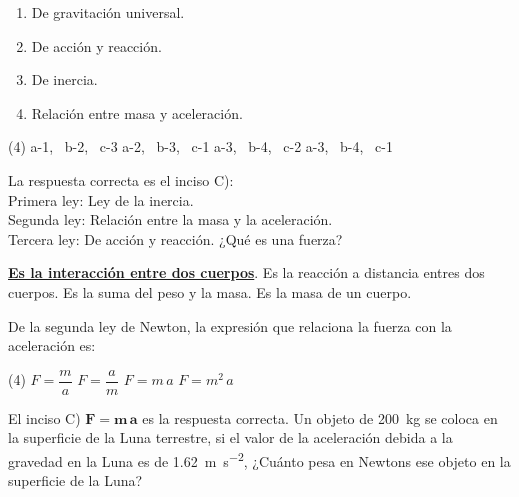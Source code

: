 \documentclass[12pt, letter]{exam}
\begin{document}
\begin{questions}
\begin{minipage}[t]{0.4\linewidth}
    \end{minipage}
    \hspace{-0.5cm}
    \begin{minipage}[t]{0.5\linewidth}
        \begin{enumerate}[label=\arabic*)]
            \itemsep0em
            \item De gravitación universal.
            \item De acción y reacción.
            \item De inercia.
            \item Relación entre masa y aceleración.
        \end{enumerate}
    \end{minipage}
    \begin{tasks}(4)
        \task a-1, \, b-2, \, c-3
        \task a-2, \, b-3, \, c-1
        \task a-3, \, b-4, \, c-2
        \task a-3, \, b-4, \, c-1
    \end{tasks}
    La respuesta correcta es el inciso C):
    \\
    Primera ley: Ley de la inercia. \\
    Segunda ley: Relación entre la masa y la aceleración. \\
    Tercera ley: De acción y reacción.
    \question ¿Qué es una fuerza?
    \begin{tasks}
        \task \underline{\textbf{Es la interacción entre dos cuerpos}}.
        \task Es la reacción a distancia entres dos cuerpos.
        \task Es la suma del peso y la masa.
        \task Es la masa de un cuerpo.
    \end{tasks}
    \question De la segunda ley de Newton, la expresión que relaciona la fuerza con la aceleración es:
    \begin{tasks}(4)
        \task $F = \dfrac{m}{a}$
        \task $F = \dfrac{a}{m}$
        \task $F = m \, a$
        \task $F = m^{2} \, a$
    \end{tasks}
    El inciso C) $\mathbf{F = m \, a}$ es la respuesta correcta.
    \question Un objeto de \SI{200}{\kilo\gram} se coloca en la superficie de la Luna terrestre, si el valor de la aceleración debida a la gravedad en la Luna es de \SI{1.62}{\meter\per\square\second}, ¿Cuánto pesa en Newtons ese objeto en la superficie de la Luna?

\end{questions}
\end{document}
